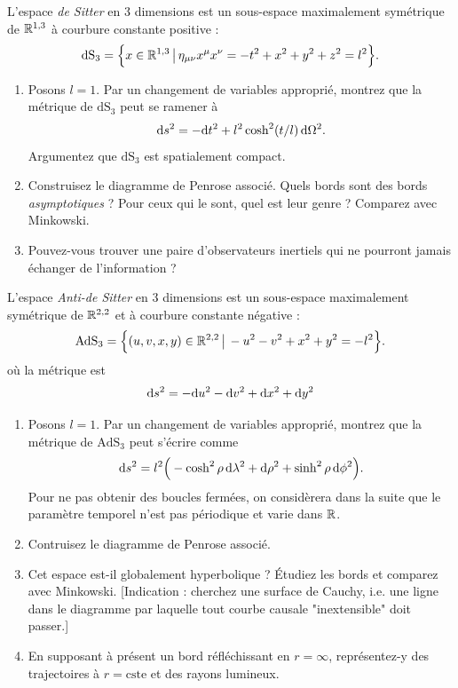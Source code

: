 \begin{exerc}
    L'espace \emph{de Sitter} en 3 dimensions est un sous-espace maximalement symétrique de $\mathbb{R}^{1,3}$ à courbure constante positive :
    \begin{align}
        \mathrm{dS}_3 = \Big\{x \in \mathbb{R}^{1,3} \,\big| \, \eta_{\mu\nu} x^\mu x^\nu = -t^2 +x^2+y^2+z^2= l^2\Big\}.
    \end{align}
    \begin{enumerate}[label = (\roman*).]
        \item Posons $l=1$. Par un changement de variables approprié, montrez que la métrique de $\mathrm{dS}_3$ peut se ramener à 
        \begin{align}
            \mathrm{d} s^2 = - \mathrm{d} t^2 + l^2 \cosh^2 (t/l) \,\mathrm{d} \Omega^2.
        \end{align}
        Argumentez que $\mathrm{dS}_3$ est spatialement compact. 
        \item Construisez le diagramme de Penrose associé. Quels bords sont des bords \emph{asymptotiques} ? Pour ceux qui le sont, quel est leur genre ? Comparez avec Minkowski.
        \item Pouvez-vous trouver une paire d'observateurs inertiels qui ne pourront jamais échanger de l'information ? 
    \end{enumerate}
\end{exerc}
\begin{exerc}
    L'espace \emph{Anti-de Sitter} en 3 dimensions est un sous-espace maximalement symétrique de $\mathbb{R}^{2,2}$ et à courbure constante négative :
    \begin{align}
        \mathrm{AdS}_3 = \Big\{(u,v,x,y) \in \mathbb{R}^{2,2} \,\big| \, -u^2 - v^2 + x^2 + y^2= -l^2\Big\}.
    \end{align}
    où la métrique est
    \begin{align}
        \mathrm{d} s^2 = -\mathrm{d} u^2 - \mathrm{d} v^2 + \mathrm{d} x^2 + \mathrm{d} y^2
    \end{align}
    \begin{enumerate}[label=(\roman*).]
        \item Posons $l=1$. Par un changement de variables approprié, montrez que la métrique de $\mathrm{AdS}_3$ peut s'écrire comme
        \begin{align}
            \mathrm{d} s^2 = l^2 \Big(- \cosh^2\rho \,\mathrm{d} \lambda^2 +\mathrm{d}\rho^2 + \sinh^2 \rho \,\mathrm{d} \phi^2 \Big).
        \end{align}
        Pour ne pas obtenir des boucles fermées, on considèrera dans la suite que le paramètre temporel n'est pas périodique et varie dans $\mathbb{R}$.
        \item Contruisez le diagramme de Penrose associé.
        \item Cet espace est-il globalement hyperbolique ? Étudiez les bords et comparez avec Minkowski. [Indication : cherchez une surface de Cauchy, i.e. une ligne dans le diagramme par laquelle tout courbe causale "inextensible" doit passer.]
        \item En supposant à présent un bord réfléchissant en $r = \infty$, représentez-y des trajectoires à $r= \text{cste}$ et des rayons lumineux.
    \end{enumerate}
\end{exerc}
